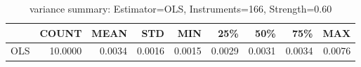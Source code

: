 \begin{table}[ht]
\centering
\caption{variance summary: Estimator=OLS, Instruments=166, Strength=0.60}
\begin{tabular}{lrrrrrrrr}
\toprule
 & COUNT & MEAN & STD & MIN & 25\% & 50\% & 75\% & MAX \\
\midrule
OLS & 10.0000 & 0.0034 & 0.0016 & 0.0015 & 0.0029 & 0.0031 & 0.0034 & 0.0076 \\
\bottomrule
\end{tabular}
\end{table}
